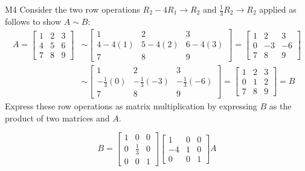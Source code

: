\begin{problem}{M4}
Consider the two row operations 
\(R_2-4R_1\to R_2\) and \(\frac{1}{3}R_2\to R_2\)
applied as follows to show \(A\sim B\):
\begin{align*}
A
  =
\begin{bmatrix}
1&2&3\\
4&5&6\\
7&8&9
\end{bmatrix}
  &\sim
\begin{bmatrix}
1&2&3\\
4-4(1)&5-4(2)&6-4(3)\\
7&8&9
\end{bmatrix}
  =
\begin{bmatrix}
1&2&3\\
0&-3&-6\\
7&8&9
\end{bmatrix}
  \\&\sim
\begin{bmatrix}
1&2&3\\
-\frac{1}{3}(0)&-\frac{1}{3}(-3)&-\frac{1}{3}(-6)\\
7&8&9
\end{bmatrix}
  =
\begin{bmatrix}
1&2&3\\
0&1&2\\
7&8&9
\end{bmatrix}
  = 
B
\end{align*}
Express these row operations as matrix multiplication
by expressing \(B\) as the product of two matrices and \(A\).
\end{problem}
\begin{solution}
\[
B
  =
\begin{bmatrix}
  1&0&0\\
  0&\frac{1}{3}&0\\
  0&0&1
\end{bmatrix}
\begin{bmatrix}
  1&0&0\\
  -4&1&0\\
  0&0&1
\end{bmatrix}
A
\]
\end{solution}


